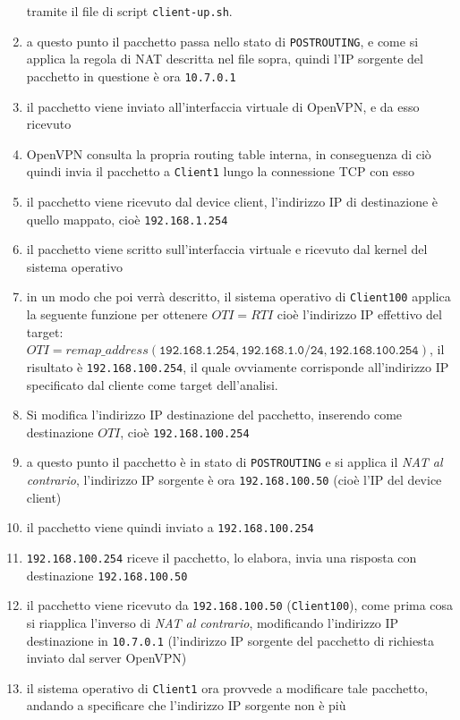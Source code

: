 \begin{enumerate}
  tramite il file di script \texttt{client-up.sh}.
  \item a questo punto il pacchetto passa nello stato di \texttt{POSTROUTING}, e come
  si applica la regola di NAT descritta nel file sopra, quindi l'IP sorgente del
  pacchetto in questione è ora \texttt{10.7.0.1}
  \item il pacchetto viene inviato all'interfaccia
  virtuale di OpenVPN, e da esso ricevuto
  \item OpenVPN consulta la propria routing table interna, in conseguenza di ciò quindi
  invia il pacchetto a \texttt{Client1} lungo la connessione TCP con esso
  \item il pacchetto viene ricevuto dal device client, l'indirizzo IP di destinazione è
  quello mappato, cioè \texttt{192.168.1.254}
  \item il pacchetto viene scritto sull'interfaccia virtuale e ricevuto dal kernel
  del sistema operativo
  \item in un modo che poi verrà descritto, il sistema operativo di \texttt{Client100}
  applica la seguente funzione
  per ottenere $OTI=RTI$ cioè l'indirizzo IP effettivo del target: $OTI=remap\_address(
  \texttt{192.168.1.254}, \texttt{192.168.1.0/24}, \texttt{192.168.100.254})$, il
  risultato è \texttt{192.168.100.254}, il quale ovviamente corrisponde all'indirizzo IP
  specificato dal cliente come target dell'analisi.
  \item Si modifica l'indirizzo IP destinazione del pacchetto, inserendo come destinazione
  $OTI$, cioè \texttt{192.168.100.254}
  \item a questo punto il pacchetto è in stato di \texttt{POSTROUTING} e si applica il
  \textit{NAT al contrario}, l'indirizzo IP sorgente è ora \texttt{192.168.100.50}
  (cioè l'IP del device client)
  \item il pacchetto viene quindi inviato a \texttt{192.168.100.254}
  \item \texttt{192.168.100.254} riceve il pacchetto, lo elabora, invia una risposta
  con destinazione \texttt{192.168.100.50}
  \item il pacchetto viene ricevuto da \texttt{192.168.100.50} (\texttt{Client100}),
  come prima cosa
  si riapplica l'inverso di \textit{NAT al contrario}, modificando l'indirizzo IP
  destinazione in \texttt{10.7.0.1} (l'indirizzo IP sorgente del pacchetto di richiesta
  inviato dal server OpenVPN)
  \item il sistema operativo di \texttt{Client1} ora provvede a modificare tale
  pacchetto, andando a specificare che l'indirizzo IP sorgente non è più

\end{enumerate}
